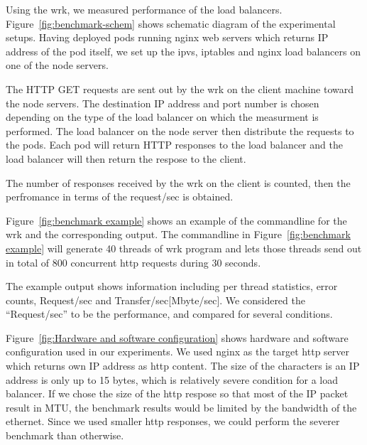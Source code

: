 Using the wrk, we measured performance of the load balancers.
Figure~\ref{fig:benchmark-schem} shows schematic diagram of the experimental setups.
Having deployed pods running nginx web servers which returns IP address of the pod itself,
we set up the ipvs, iptables and nginx load balancers on one of the node servers. 

The HTTP GET requests are sent out by the wrk on the client machine toward the node servers.
The destination IP address and port number is chosen 
depending on the type of the load balancer on which the measurment is performed.
The load balancer on the node server then distribute the requests to the pods.
Each pod will return HTTP responses to the load balancer and the load balancer will then return the respose to the client.

The number of responses received by the wrk on the client is counted, 
then the perfromance in terms of the request/sec is obtained. 

Figure~\ref{fig:benchmark example} shows an example of the commandline for the wrk and the corresponding output.
The commandline in Figure~\ref{fig:benchmark example} will generate 40 threads of wrk program 
and lets those threads send out in total of 800 concurrent http requests during 30 seconds.

The example output shows information including per thread statistics, error counts, Request/sec and Transfer/sec[Mbyte/sec].
We considered the \enquote{Request/sec} to be the performance, and compared for several conditions.

Figure~\ref{fig:Hardware and software configuration} shows hardware and software configuration used in our experiments.
We used nginx as the target http server which returns own IP address as http content. 
The size of the characters is an IP address is only up to 15 bytes, 
which is relatively severe condition for a load balancer.
If we chose the size of the http respose so that most of the IP packet result in MTU,
the benchmark results would be limited by the bandwidth of the ethernet.
Since we used smaller http responses, we could perform the severer benchmark than otherwise.

